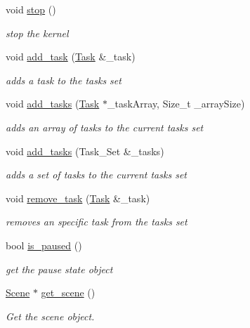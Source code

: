 \begin{DoxyCompactItemize}
void \mbox{\hyperlink{classbanita_1_1_kernel_aee9ff2e2d1816a4b3c1ef2694034e0ce}{stop}} ()
\begin{DoxyCompactList}\small\item\em stop the kernel \end{DoxyCompactList}\item 
void \mbox{\hyperlink{classbanita_1_1_kernel_a51ad67eb5beec04052643a58698a1263}{add\+\_\+task}} (\mbox{\hyperlink{classbanita_1_1_task}{Task}} \&\+\_\+task)
\begin{DoxyCompactList}\small\item\em adds a task to the tasks set \end{DoxyCompactList}\item 
void \mbox{\hyperlink{classbanita_1_1_kernel_a50aee62acd308f995925dab46106ef75}{add\+\_\+tasks}} (\mbox{\hyperlink{classbanita_1_1_task}{Task}} $\ast$\+\_\+task\+Array, Size\+\_\+t \+\_\+array\+Size)
\begin{DoxyCompactList}\small\item\em adds an array of tasks to the current tasks set \end{DoxyCompactList}\item 
void \mbox{\hyperlink{classbanita_1_1_kernel_aad63c1940db1247c8ba02fb84f78ec1f}{add\+\_\+tasks}} (Task\+\_\+\+Set \&\+\_\+tasks)
\begin{DoxyCompactList}\small\item\em adds a set of tasks to the current tasks set \end{DoxyCompactList}\item 
void \mbox{\hyperlink{classbanita_1_1_kernel_a463aa154233f381167fc18f6e754b084}{remove\+\_\+task}} (\mbox{\hyperlink{classbanita_1_1_task}{Task}} \&\+\_\+task)
\begin{DoxyCompactList}\small\item\em removes an specific task from the tasks set \end{DoxyCompactList}\item 
bool \mbox{\hyperlink{classbanita_1_1_kernel_a7d940a9448b56f01eb2ca1bc415b661f}{is\+\_\+paused}} ()
\begin{DoxyCompactList}\small\item\em get the pause state object \end{DoxyCompactList}\item 
\mbox{\hyperlink{classbanita_1_1_scene}{Scene}} $\ast$ \mbox{\hyperlink{classbanita_1_1_kernel_a0a5e53e8727da203aad7dcb730a39244}{get\+\_\+scene}} ()
\begin{DoxyCompactList}\small\item\em Get the scene object. \end{DoxyCompactList}\end{DoxyCompactItemize}
